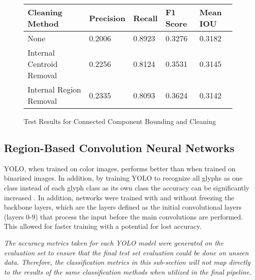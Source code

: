 \begin{figure}[H]
    \caption{Test Results for Connected Component Bounding and Cleaning}
    \label{fig:ccBoundingEval}
    \centering
    \begin{tabular}{ | l | l | l | l | l | }
        \hline
        Cleaning Method & Precision & Recall & F1 Score & Mean IOU \\
        \hline
        None & 0.2006 & 0.8923 & 0.3276 & 0.3182 \\
        Internal Centroid Removal & 0.2256 & 0.8124 & 0.3531 & 0.3145 \\
        Internal Region Removal & 0.2335 & 0.8093 & 0.3624 & 0.3142 \\
        \hline
    \end{tabular}
\end{figure}

\subsection{Region-Based Convolution Neural Networks}

YOLO, when trained on color images, performs better than when trained on binarized images. In addition, by training YOLO to recognize all glyphs as one class instead of each glyph class as its own class the accuracy can be significantly increased . In addition, networks were trained with and without freezing the backbone layers, which are the layers defined as the initial convolutional layers (layers 0-9) \cite{YOLOBackbone} that process the input before the main convolutions are performed. This allowed for faster training with a potential for lost accuracy.

\textit{The accuracy metrics taken for each YOLO model were generated on the evaluation set to ensure that the final test set evaluation could be done on unseen data. Therefore, the classification metrics in this sub-section will not map directly to the results of the same classification methods when utilized in the final pipeline.}

